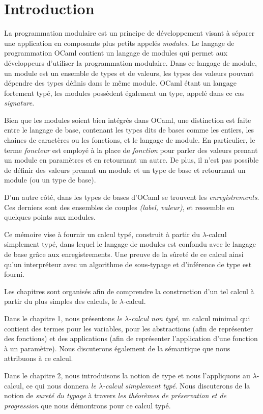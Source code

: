 \chapter{Introduction}

La programmation modulaire est un principe de développement visant à séparer une
application en composants plus petits appelés \textit{modules}. Le langage de
programmation OCaml contient un langage de modules qui permet aux développeurs
d'utiliser la programmation modulaire. Dans ce langage de module, un module est
un ensemble de types et de valeurs, les types des valeurs pouvant dépendre des
types définis dans le même module.
OCaml étant un langage fortement typé, les modules possèdent également
un type, appelé dans ce cas \textit{signature}.

Bien que les modules soient bien intégrés dans OCaml, une
distinction est faite entre le langage de base, contenant les types dits \og de
bases \fg comme les entiers, les chaines de caractères ou les fonctions, et le
langage de module. En particulier, le terme \textit{foncteur} est employé à la
place de \textit{fonction} pour parler des valeurs prenant un module en
paramètres et en retournant un autre. De plus, il n'est pas possible de définir
des valeurs prenant un module et un type de base et retournant un module (ou un
type de base).

D'un autre côté, dans les types de bases d'OCaml se trouvent les
\textit{enregistrements}. Ces derniers sont des ensembles de couples
\textit{(label, valeur)}, et ressemble en quelques points aux modules.

Ce mémoire vise à fournir un calcul typé, construit à partir du $\lambda$-calcul
simplement typé, dans lequel le langage de modules est confondu avec le langage
de base grâce aux enregistrements. Une preuve de la sûreté de ce calcul ainsi
qu'un interpréteur avec un algorithme de sous-typage et d'inférence de type est
fourni.

Les chapitres sont organisés afin de comprendre la construction d'un tel calcul
à partir du plus simples des calculs, le $\lambda$-calcul.

Dans le chapitre 1, nous présentons \textit{le $\lambda$-calcul non typé}, un calcul
minimal qui contient des termes pour les variables, pour les abstractions (afin
de représenter des fonctions) et des applications (afin de représenter
l'application d'une fonction à un paramètre). Nous discuterons également de la
sémantique que nous attribuons à ce calcul. 

Dans le chapitre 2, nous introduisons la notion de type et nous l'appliquons au
$\lambda$-calcul, ce qui nous donnera \textit{le $\lambda$-calcul simplement typé}. Nous
discuterons de la notion de \textit{sureté du typage} à travers \textit{les théorèmes
de préservation et de progression} que nous démontrons pour ce calcul typé.

